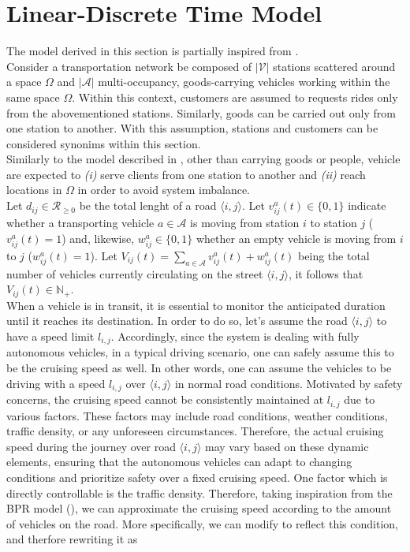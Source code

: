 \section{Linear-Discrete Time Model}\label{sec:linear_discrete_time_model}
The model derived in this section is partially inspired from \cite{zhang2016}. \\
Consider a transportation network be composed of $|\mathcal{V}|$ stations scattered around a space $\Omega$ and $|\mathcal{A}|$ multi-occupancy, goods-carrying vehicles working within the same space $\Omega$. Within this context, customers are assumed to requests rides only from the abovementioned stations. Similarly, goods can be carried out only from one station to another. With this assumption, stations and customers can be considered synonims within this section. \\
Similarly to the model described in , other than carrying goods or people, vehicle are expected to \textit{(i)} serve clients from one station to another and \textit{(ii)} reach locations in $\Omega$ in order to avoid system imbalance. \\
Let $d_{ij} \in \mathcal{R}_{\ge0}$ be the total lenght of a road \(\langle i,j\rangle\). Let $v^a_{ij}(t) \in \{0,1\}$ indicate whether a transporting vehicle $a \in \mathcal{A}$ is moving from station $i$ to station $j$ ($v^a_{ij}(t) = 1$) and, likewise, $w^{a}_{ij}\in \{0,1\} $ whether an empty vehicle is moving from $i$ to $j$ ($w^{a}_{ij}(t)= 1$). Let $V_{ij}(t) = \sum_{a \in \mathcal{A}} v^{a}_{ij}(t) +w^{a}_{ij}(t)$ being the total number of vehicles currently circulating on the street $\langle i,j\rangle$, it follows that $V_{ij}(t) \in \mathbb{N}_+$. \\
When a vehicle is in transit, it is essential to monitor the anticipated duration until it reaches its destination. In order to do so, let's assume the road $\langle i,j\rangle$ to have a speed limit $l_{i,j}$. Accordingly, since the system is dealing with fully autonomous vehicles, in a typical driving scenario, one can safely assume this to be the cruising speed as well. In other words, one can assume the vehicles to be driving with a speed $l_{i,j}$ over $\langle i,j\rangle$ in normal road conditions.  Motivated by safety concerns, the cruising speed cannot be consistently maintained at \(l_{i,j}\) due to various factors. These factors may include road conditions, weather conditions, traffic density, or any unforeseen circumstances. Therefore, the actual cruising speed during the journey over road \(\langle i,j\rangle\) may vary based on these dynamic elements, ensuring that the autonomous vehicles can adapt to changing conditions and prioritize safety over a fixed cruising speed. One factor which is directly controllable is the traffic density. Therefore, taking inspiration from the BPR model (), we can approximate the cruising speed according to the amount of vehicles on the road. More specifically, we can modify  to reflect this condition, and therfore rewriting it as \\
